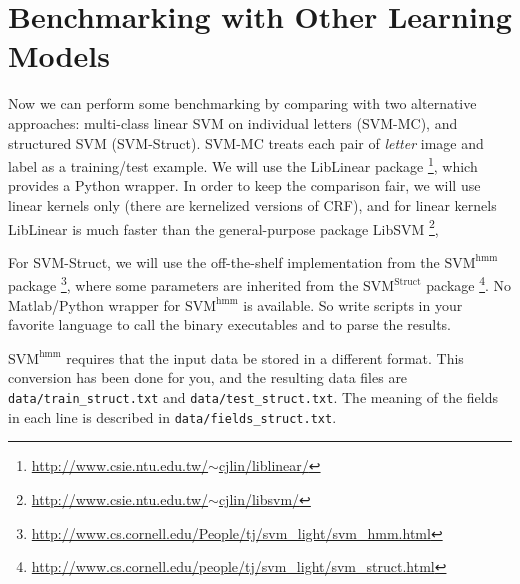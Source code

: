 \documentclass[11pt]{report}
\begin{document}
\section{Benchmarking with Other Learning Models}

Now we can perform some benchmarking by comparing with two alternative approaches:
multi-class linear SVM on individual letters (SVM-MC),
and structured SVM (SVM-Struct).
SVM-MC treats each pair of \emph{letter} image and label as a training/test example.
We will use the LibLinear package%
\footnote{\href{http://www.csie.ntu.edu.tw/~cjlin/liblinear/}{http://www.csie.ntu.edu.tw/$\sim$cjlin/liblinear/}},
which provides a Python wrapper.
In order to keep the comparison fair,
we will use linear kernels only (there are kernelized versions of CRF),
and for linear kernels LibLinear is much faster than the general-purpose package LibSVM%
\footnote{\href{http://www.csie.ntu.edu.tw/~cjlin/libsvm/}{http://www.csie.ntu.edu.tw/$\sim$cjlin/libsvm/}},


For SVM-Struct, we will use the off-the-shelf implementation from the $\text{SVM}^{\text{hmm}}$ package%
\footnote{\href{http://www.cs.cornell.edu/People/tj/svm_light/svm_hmm.html}{http://www.cs.cornell.edu/People/tj/svm\_light/svm\_hmm.html}},
where some parameters are inherited from the $\text{SVM}^{\text{Struct}}$ package%
\footnote{\href{http://www.cs.cornell.edu/people/tj/svm_light/svm_struct.html}{http://www.cs.cornell.edu/people/tj/svm\_light/svm\_struct.html}}.
No Matlab/Python wrapper for $\text{SVM}^{\text{hmm}}$ is available.
So write scripts in your favorite language to call the binary executables and to parse the results.


$\text{SVM}^{\text{hmm}}$ requires that the input data be stored in a different format.
This conversion has been done for you, and the resulting data files are \verb#data/train_struct.txt# and \verb#data/test_struct.txt#.
The meaning of the fields in each line is described in \verb#data/fields_struct.txt#.
\end{document}
